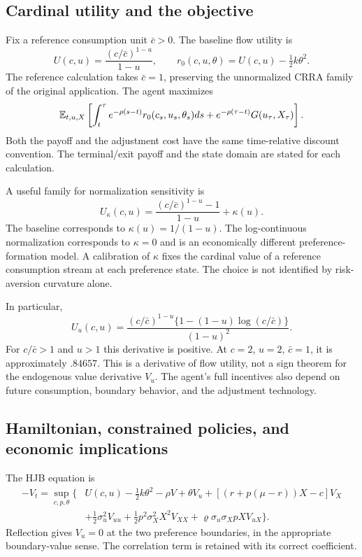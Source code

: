 \subsection{Cardinal utility and the objective}
Fix a reference consumption unit $\bar c>0$. The baseline flow utility is
\begin{equation}\label{eq:nduutility}
 U(c,u)=\frac{(c/\bar c)^{1-u}}{1-u},\qquad
 r_0(c,u,\theta)=U(c,u)-\tfrac12 k\theta^2.
\end{equation}
The reference calculation takes $\bar c=1$, preserving the unnormalized CRRA family of the original application. The agent maximizes
\begin{equation}\label{eq:nduobjective}
 \mathbb E_{t,u,X}\left[\int_t^\tau e^{-\rho(s-t)}r_0(c_s,u_s,\theta_s)ds
        +e^{-\rho(\tau-t)}G(u_\tau,X_\tau)\right].
\end{equation}
Both the payoff and the adjustment cost have the same time-relative discount convention. The terminal/exit payoff and the state domain are stated for each calculation.

A useful family for normalization sensitivity is
\[
 U_\kappa(c,u)=\frac{(c/\bar c)^{1-u}-1}{1-u}+\kappa(u).
\]
The baseline corresponds to $\kappa(u)=1/(1-u)$. The log-continuous normalization corresponds to $\kappa=0$ and is an economically different preference-formation model. A calibration of $\kappa$ fixes the cardinal value of a reference consumption stream at each preference state. The choice is not identified by risk-aversion curvature alone.

In particular,
\begin{equation}\label{eq:uderivative}
 U_u(c,u)=\frac{(c/\bar c)^{1-u}\{1-(1-u)\log(c/\bar c)\}}{(1-u)^2}.
\end{equation}
For $c/\bar c>1$ and $u>1$ this derivative is positive. At $c=2$, $u=2$, $\bar c=1$, it is approximately $.84657$. This is a derivative of flow utility, not a sign theorem for the endogenous value derivative $V_u$. The agent's full incentives also depend on future consumption, boundary behavior, and the adjustment technology.

\subsection{Hamiltonian, constrained policies, and economic implications}
The HJB equation is
\begin{align}\label{eq:nduhjb}
 -V_t=\sup_{c,p,\theta}\big\{&U(c,u)-\tfrac12 k\theta^2-\rho V
 +\theta V_u+[(r+p(\mu-r))X-c]V_X\nonumber\\
 &+\tfrac12\sigma_u^2V_{uu}+\tfrac12p^2\sigma_X^2X^2V_{XX}
 +\varrho\sigma_u\sigma_X pX V_{uX}\big\}.
\end{align}
Reflection gives $V_u=0$ at the two preference boundaries, in the appropriate boundary-value sense. The correlation term is retained with its correct coefficient.

